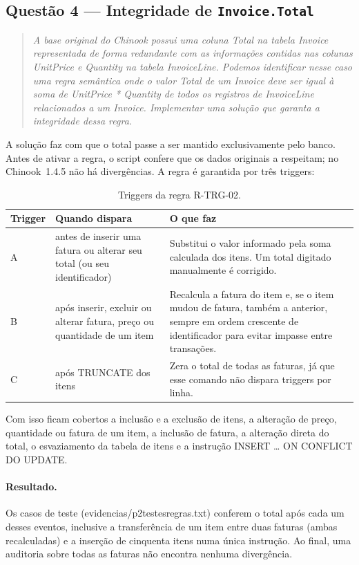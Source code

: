 \documentclass[11pt,a4paper]{article}
\newcommand{\cod}[1]{{\ttfamily\renewcommand{\_}{\textunderscore\allowbreak}#1}}
\newenvironment{enunciado}{\begin{quote}\small\itshape}{\end{quote}}
\begin{document}
\subsection{Questão 4 --- Integridade de \texttt{Invoice.Total}}

\begin{enunciado}
A base original do Chinook possui uma coluna Total na tabela Invoice representada de forma redundante com as
informações contidas nas colunas UnitPrice e Quantity na tabela InvoiceLine. Podemos identificar nesse caso uma
regra semântica onde o valor Total de um Invoice deve ser igual à soma de UnitPrice * Quantity de todos os
registros de InvoiceLine relacionados a um Invoice. Implementar uma solução que garanta a integridade dessa
regra.
\end{enunciado}

A solução faz com que o total passe a ser mantido exclusivamente pelo banco. Antes de ativar a regra, o script
confere que os dados originais a respeitam; no Chinook~1.4.5 não há divergências. A regra é garantida por três
triggers:

\begin{table}[!htb]
\centering\small
\begin{tabularx}{\textwidth}{@{}lp{4.6cm}X@{}}
\toprule
Trigger & Quando dispara & O que faz \\
\midrule
A & antes de inserir uma fatura ou alterar seu total (ou seu identificador) & Substitui o valor informado pela soma calculada dos
itens. Um total digitado manualmente é corrigido. \\
B & após inserir, excluir ou alterar fatura, preço ou quantidade de um item & Recalcula a fatura do item e, se o
item mudou de fatura, também a anterior, sempre em ordem crescente de identificador para evitar impasse entre
transações. \\
C & após \cod{TRUNCATE} dos itens & Zera o total de todas as faturas, já que esse comando não dispara triggers
por linha. \\
\bottomrule
\end{tabularx}
\caption{Triggers da regra R-TRG-02.}
\end{table}

Com isso ficam cobertos a inclusão e a exclusão de itens, a alteração de preço, quantidade ou fatura de um item,
a inclusão de fatura, a alteração direta do total, o esvaziamento da tabela de itens e a instrução
\cod{INSERT \dots{} ON CONFLICT DO UPDATE}.

\paragraph{Resultado.} Os \numCasosT{} casos de teste (\cod{evidencias/p2\_testes\_regras.txt}) conferem o total após cada um desses eventos, inclusive a
transferência de um item entre duas faturas (ambas recalculadas) e a inserção de cinquenta itens numa única
instrução. Ao final, uma auditoria sobre todas as faturas não encontra nenhuma divergência.
\end{document}
